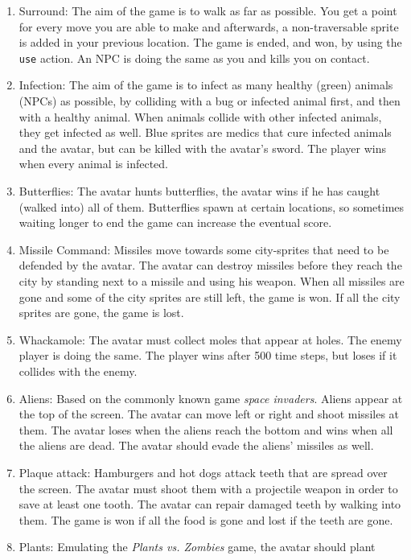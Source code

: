 \begin{enumerate}
	\item Surround: 
		The aim of the game is to walk as far as possible. You get a point for
		every move you are able to make and afterwards, a non-traversable sprite
		is added in your previous location. The game is ended, and won, by using
		the \texttt{use} action. An NPC is doing the same as you and kills you
		on contact.
	\item Infection:
		The aim of the game is to infect as many healthy (green) animals (NPCs)
		as possible, by colliding with a bug or infected animal first, and then
		with a healthy animal. When animals collide with other infected animals,
		they get infected as well. Blue sprites are medics that cure infected
		animals and the avatar, but can be killed with the avatar's sword. The
		player wins when every animal is infected.
	\item Butterflies: 
		The avatar hunts butterflies, the avatar wins if he has caught (walked
		into) all of them. Butterflies spawn at certain locations, so sometimes
		waiting longer to end the game can increase the eventual score.
	\item Missile Command: 
		Missiles move towards some city-sprites that need to be defended by the
		avatar. The avatar can destroy missiles before they reach the city by
		standing next to a missile and using his weapon. When all missiles are
		gone and some of the city sprites are still left, the game is won. If
		all the city sprites are gone, the game is lost.
	\item Whackamole:
		The avatar must collect moles that appear at holes. The enemy player is
		doing the same. The player wins after 500 time steps, but loses if it
		collides with the enemy.
	\item Aliens:
		Based on the commonly known game \textit{space invaders}. Aliens appear
		at the top of the screen. The avatar can move left or right and shoot
		missiles at them. The avatar loses when the aliens reach the bottom and
		wins when all the aliens are dead. The avatar should evade the aliens'
		missiles as well.
	\item Plaque attack:
		Hamburgers and hot dogs attack teeth that are spread over the screen. The
		avatar must shoot them with a projectile weapon in order to save at
		least one tooth. The avatar can repair damaged teeth by walking into
		them. The game is won if all the food is gone and lost if the teeth are
		gone.
	\item Plants:
		Emulating the \textit{Plants vs. Zombies} game, the avatar should plant

\end{enumerate}
